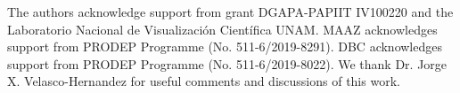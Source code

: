     The authors acknowledge support from grant
    DGAPA-PAPIIT IV100220 and the Laboratorio Nacional de
    Visualizaci\'on Cient\'ifica UNAM. MAAZ acknowledges support from
    PRODEP Programme (No. 511-6/2019-8291).
    DBC acknowledges support
    from PRODEP Programme (No. 511-6/2019-8022).
    We thank Dr. Jorge X. Velasco-Hernandez for useful
    comments and discussions of this work.